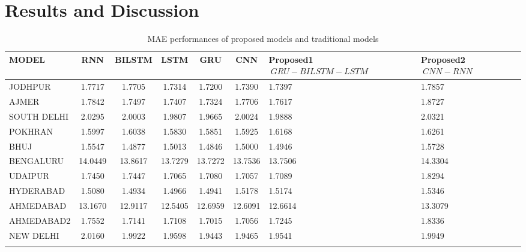 \documentclass[a4paper,fleqn]{cas-sc}
\begin{document}
\section{Results and Discussion}

\begin{table}[!ht]
\centering
\caption{MAE performances of proposed models  and traditional models}
\begin{tabular}{|l|c|c|c|c|c|p{}|p{}|}
\hline
\textbf{MODEL} & \textbf{RNN} & \textbf{BILSTM} & \textbf{LSTM} & \textbf{GRU} & \textbf{CNN} &\textbf{Proposed1 \(\ GRU-BILSTM-LSTM \)\ } & \textbf{Proposed2 \(\ CNN-RNN\)\ } \\ \hline
JODHPUR & 1.7717 & 1.7705 & 1.7314 & 1.7200 & 1.7390 & 1.7397 & 1.7857 \\ \hline
AJMER & 1.7842 & 1.7497 & 1.7407 & 1.7324 & 1.7706 & 1.7617 & 1.8727 \\ \hline
SOUTH DELHI & 2.0295 & 2.0003 & 1.9807 & 1.9665 & 2.0024 & 1.9888 & 2.0321 \\ \hline
POKHRAN & 1.5997 & 1.6038 & 1.5830 & 1.5851 & 1.5925 & 1.6168 & 1.6261 \\ \hline
BHUJ & 1.5547 & 1.4877 & 1.5013 & 1.4846 & 1.5000 & 1.4946 & 1.5728 \\ \hline
BENGALURU & 14.0449 & 13.8617 & 13.7279 & 13.7272 & 13.7536 & 13.7506 & 14.3304 \\ \hline
UDAIPUR & 1.7450 & 1.7447 & 1.7065 & 1.7080 & 1.7057 & 1.7089 & 1.8294 \\ \hline
HYDERABAD & 1.5080 & 1.4934 & 1.4966 & 1.4941 & 1.5178 & 1.5174 & 1.5346 \\ \hline
AHMEDABAD & 13.1670 & 12.9117 & 12.5405 & 12.6959 & 12.6091 & 12.6614 & 13.3079 \\ \hline
AHMEDABAD2 & 1.7552 & 1.7141 & 1.7108 & 1.7015 & 1.7056 & 1.7245 & 1.8336 \\ \hline
NEW DELHI & 2.0160 & 1.9922 & 1.9598 & 1.9443 & 1.9465 & 1.9541 & 1.9949 \\ \hline
\label{mae}
\end{tabular}
\end{table}
\end{document}
